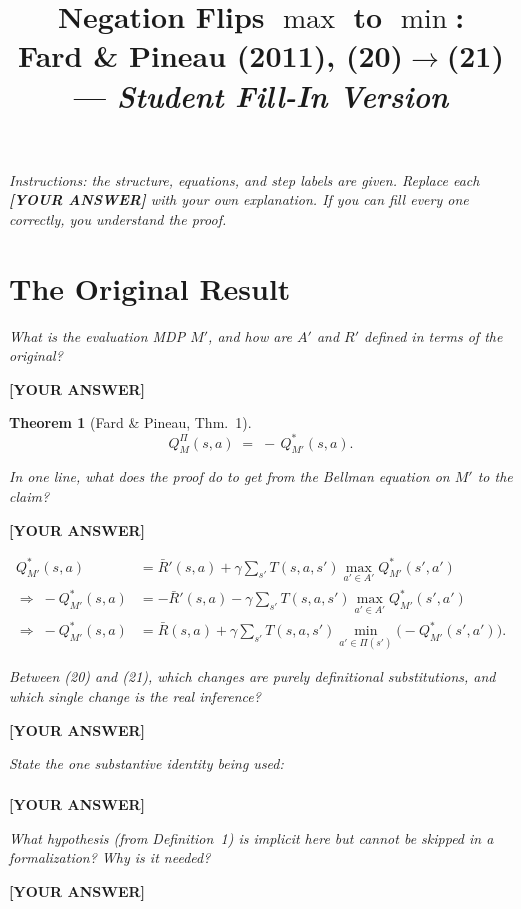 \documentclass[11pt]{article}
\title{Negation Flips \texorpdfstring{$\max$}{max} to \texorpdfstring{$\min$}{min}:\\
  Fard \& Pineau (2011), (20)$\to$(21) --- \emph{Student Fill-In Version}}
\author{}
\date{}
\newtheorem{theorem}{Theorem}
\newcommand{\blank}{\par\vspace{2pt}\noindent\textbf{[YOUR ANSWER]}\par\vspace{6pt}}
\newcommand{\blankone}{\textbf{[YOUR ANSWER]}}
\begin{document}
\maketitle

\noindent\small\textit{Instructions: the structure, equations, and step labels
are given. Replace each \textbf{[YOUR ANSWER]} with your own explanation. If you
can fill every one correctly, you understand the proof.}\normalsize

\vspace{1em}

\section{The Original Result}

\emph{What is the evaluation MDP $M'$, and how are $A'$ and $R'$ defined in terms
of the original?}
\blank

\begin{theorem}[Fard \& Pineau, Thm.~1]
\[
  Q^{\Pi}_M(s,a) \;=\; -\,Q^{*}_{M'}(s,a).
\]
\end{theorem}

\emph{In one line, what does the proof do to get from the Bellman equation on
$M'$ to the claim?}
\blank

\begin{align}
  Q^{*}_{M'}(s,a)
    &= \bar R'(s,a) + \gamma \sum_{s'} T(s,a,s') \max_{a' \in A'} Q^{*}_{M'}(s',a')
      \tag{19}\\[2pt]
  \Rightarrow\; -Q^{*}_{M'}(s,a)
    &= -\bar R'(s,a) - \gamma \sum_{s'} T(s,a,s') \max_{a' \in A'} Q^{*}_{M'}(s',a')
      \tag{20}\\[2pt]
  \Rightarrow\; -Q^{*}_{M'}(s,a)
    &= \bar R(s,a) + \gamma \sum_{s'} T(s,a,s') \min_{a' \in \Pi(s')}\!\bigl(-Q^{*}_{M'}(s',a')\bigr).
      \tag{21}
\end{align}

\emph{Between (20) and (21), which changes are purely definitional substitutions,
and which single change is the real inference?}
\blank

\emph{State the one substantive identity being used:}
\[
  \phantom{-\max_{a'} Q \;=\; \min_{a'}(-Q)}
\]
\blankone

\emph{What hypothesis (from Definition~1) is implicit here but cannot be skipped
in a formalization? Why is it needed?}
\blank

\end{document}
